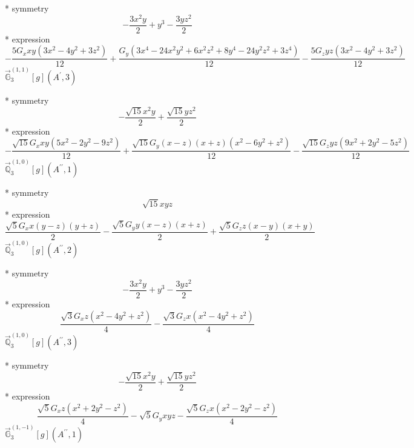 \documentclass[fleqn,8pt]{jsarticle}
\begin{document}
\noindent\quad ** symmetry
\begin{dmath*}
- \frac{3 x^{2} y}{2} + y^{3} - \frac{3 y z^{2}}{2}
\end{dmath*}
\noindent\quad ** expression
\begin{dmath*}
- \frac{5 G_{x} x y \left(3 x^{2} - 4 y^{2} + 3 z^{2}\right)}{12} + \frac{G_{y} \left(3 x^{4} - 24 x^{2} y^{2} + 6 x^{2} z^{2} + 8 y^{4} - 24 y^{2} z^{2} + 3 z^{4}\right)}{12} - \frac{5 G_{z} y z \left(3 x^{2} - 4 y^{2} + 3 z^{2}\right)}{12}
\end{dmath*}
\noindent\quad $\vec{\mathbb{G}}_{3}^{(1,1)}[g](A^{\prime},3)$

\noindent\quad ** symmetry
\begin{dmath*}
- \frac{\sqrt{15} x^{2} y}{2} + \frac{\sqrt{15} y z^{2}}{2}
\end{dmath*}
\noindent\quad ** expression
\begin{dmath*}
- \frac{\sqrt{15} G_{x} x y \left(5 x^{2} - 2 y^{2} - 9 z^{2}\right)}{12} + \frac{\sqrt{15} G_{y} \left(x - z\right) \left(x + z\right) \left(x^{2} - 6 y^{2} + z^{2}\right)}{12} - \frac{\sqrt{15} G_{z} y z \left(9 x^{2} + 2 y^{2} - 5 z^{2}\right)}{12}
\end{dmath*}
\noindent\quad $\vec{\mathbb{Q}}_{3}^{(1,0)}[g](A^{\prime\prime},1)$

\noindent\quad ** symmetry
\begin{dmath*}
\sqrt{15} x y z
\end{dmath*}
\noindent\quad ** expression
\begin{dmath*}
\frac{\sqrt{5} G_{x} x \left(y - z\right) \left(y + z\right)}{2} - \frac{\sqrt{5} G_{y} y \left(x - z\right) \left(x + z\right)}{2} + \frac{\sqrt{5} G_{z} z \left(x - y\right) \left(x + y\right)}{2}
\end{dmath*}
\noindent\quad $\vec{\mathbb{Q}}_{3}^{(1,0)}[g](A^{\prime\prime},2)$

\noindent\quad ** symmetry
\begin{dmath*}
- \frac{3 x^{2} y}{2} + y^{3} - \frac{3 y z^{2}}{2}
\end{dmath*}
\noindent\quad ** expression
\begin{dmath*}
\frac{\sqrt{3} G_{x} z \left(x^{2} - 4 y^{2} + z^{2}\right)}{4} - \frac{\sqrt{3} G_{z} x \left(x^{2} - 4 y^{2} + z^{2}\right)}{4}
\end{dmath*}
\noindent\quad $\vec{\mathbb{Q}}_{3}^{(1,0)}[g](A^{\prime\prime},3)$

\noindent\quad ** symmetry
\begin{dmath*}
- \frac{\sqrt{15} x^{2} y}{2} + \frac{\sqrt{15} y z^{2}}{2}
\end{dmath*}
\noindent\quad ** expression
\begin{dmath*}
\frac{\sqrt{5} G_{x} z \left(x^{2} + 2 y^{2} - z^{2}\right)}{4} - \sqrt{5} G_{y} x y z - \frac{\sqrt{5} G_{z} x \left(x^{2} - 2 y^{2} - z^{2}\right)}{4}
\end{dmath*}
\noindent\quad $\vec{\mathbb{G}}_{3}^{(1,-1)}[g](A^{\prime\prime},1)$
\end{document}
